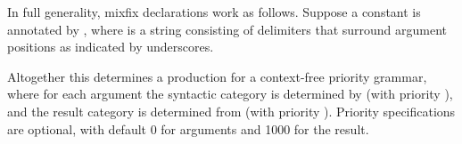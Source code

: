 \begin{isabellebody}
\begin{isamarkuptext}
  \medskip In full generality, mixfix declarations work as follows.
  Suppose a constant  is
  annotated by , where  is a string  consisting of
  delimiters that surround argument positions as indicated by
  underscores.

  Altogether this determines a production for a context-free priority
  grammar, where for each argument  the syntactic category
  is determined by  (with priority ), and
  the result category is determined from  (with
  priority ).  Priority specifications are optional, with
  default 0 for arguments and 1000 for the result.


\end{isamarkuptext}
\end{isabellebody}
